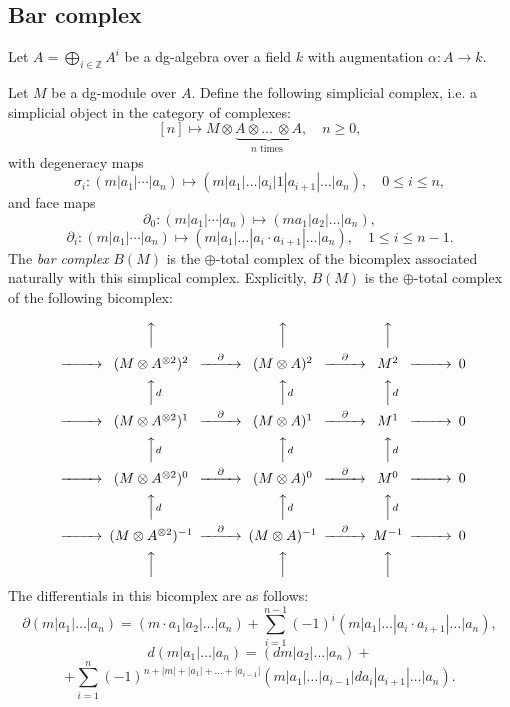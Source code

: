 \documentclass[10pt,russian]{article}
\theoremstyle{plain}
\theoremstyle{definition}
\newcommand{\Z}{\mathbb{Z}}
\begin{document}
%
 \subsection{Bar complex}
 \label{bar_complex}
	
	Let $A = \bigoplus_{i \in \Z} A^i$ be a dg-algebra over a field $k$ with augmentation $\alpha: A \to k$.
	
Let $M$ be a dg-module over $A$. Define the following simplicial complex, i.e. a simplicial object in the category of complexes:
\begin{equation}\label{eq:simplicial}
[n] \mapsto M \otimes \underbrace{A \otimes \ldots \  \otimes A}_\text{$n$ times },\quad n\geqslant 0,
\end{equation}
with degeneracy maps
$$
 \sigma_{i} \colon (m|a_1| \cdots |a_n) \mapsto (m|a_1| \ldots |a_i|1|a_{i+1}| \ldots |a_n),\quad 0\leqslant i \leqslant n,
$$
and face maps
$$
\partial_{0} \colon (m|a_1| \cdots |a_n) \mapsto (ma_1|a_2|  \ldots |a_n), 
$$
$$
\partial_{i} \colon (m|a_1| \cdots |a_n) \mapsto (m|a_1| \ldots |a_{i} \cdot a_{i+1}| \ldots |a_n), \quad 1\leqslant i \leqslant n-1.
$$
The \emph{bar complex} $B(M)$ is the $\oplus$-total complex of the bicomplex associated naturally with this simplical complex. Explicitly, $B(M)$ is the $\oplus$-total complex of the following bicomplex:

$$
	\begin{CD}
		@. @AAA @AAA@AAA\\
		@>>>(M \otimes A^{\otimes 2})^2@>\partial>>(M \otimes A)^2 @>\partial>> M^2 @>>> 0\\
		@. @AA d A @AA d A@AA d A\\
		@>>>(M \otimes A^{\otimes 2})^1@>\partial>>(M \otimes A)^1 @>\partial>> M^1 @>>> 0\\
		@. @AA d A @AA d A@AA d A\\
		@>>>(M \otimes A^{\otimes 2})^0@>\partial>>(M \otimes A)^0 @>\partial>> M^0 @>>> 0\\
		@. @AA d A @AA d A@AA d A\\
		@>>>(M \otimes A^{\otimes 2})^{-1}@>\partial>>(M \otimes A)^{-1} @>\partial>> M^{-1} @>>> 0\\
		@. @AAA @AAA@AAA
	\end{CD}
$$
The differentials in this bicomplex are as follows:
$$
\partial(m | a_1|\ldots|a_n)= (m \cdot a_1|a_2 | \ldots |a_n) +\sum_{i=1}^{n-1} (-1)^i
(m | a_1|\ldots |a_i\cdot a_{i+1}|\ldots|a_n),
$$
$$
d(m | a_1|\ldots|a_n)=(dm | a_2|\ldots|a_n)+
$$
$$
+\sum_{i=1}^n (-1)^{n+|m|+|a_1|+\ldots+|a_{i-1}|}(m | a_1|\ldots|a_{i-1}|da_i|a_{i+1}|\ldots|a_n).
$$
\end{document}
